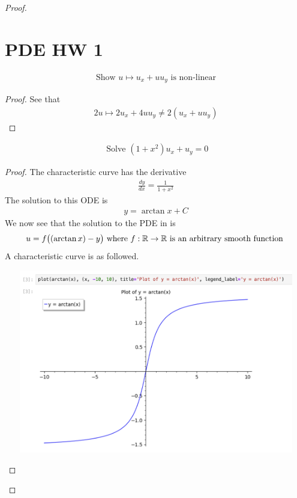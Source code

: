 \documentclass{report}
\begin{document}
\begin{proof}
\section{PDE HW 1}
\begin{theorem}
\begin{align*}
\text{ Show }u\mapsto u_x+uu_y\text{ is non-linear }
\end{align*}
\end{theorem}
\begin{proof}
See that 
\begin{align}
\label{he1}
2u\mapsto 2u_x+4uu_y\neq 2(u_x+uu_y)
\end{align}
\end{proof}
\begin{theorem}
\begin{align*}
\text{ Solve }(1+x^2)u_x+u_y=0
\end{align*}
\end{theorem}
\begin{proof}
The characteristic curve has the derivative 
\begin{align*}
\frac{dy}{dx}=\frac{1}{1+x^2}
\end{align*}
The solution to this ODE is 
\begin{align*}
y=\arctan x + C
\end{align*}
We now see that the solution to the PDE in  is 
\begin{align*}
u=f\big((\arctan x)-y\big)\text{ where }f:\mathbb{R}\rightarrow \mathbb{R}\text{ is an arbitrary smooth function }
\end{align*}
A characteristic curve is as followed.
\begin{center}
   \begin{minipage}{0.9\linewidth}  
       \centering       
\includegraphics[height=8cm,width=15cm]{pdehw1}

\end{minipage}
\end{center}
\end{proof}
\end{proof}
\end{document}
